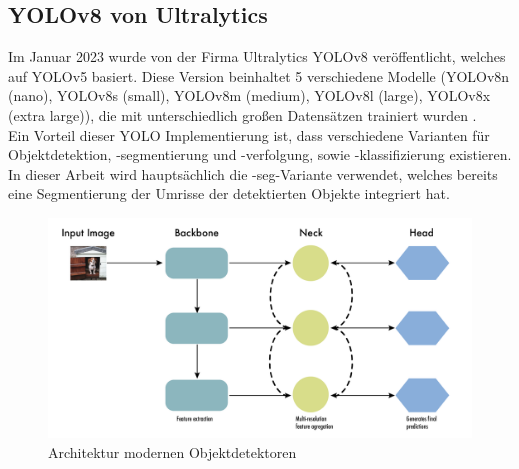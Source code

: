 	\subsection{YOLOv8 von Ultralytics}{ \label{subsec:YOLOv8_theoretic}
	
	Im Januar 2023 wurde von der Firma Ultralytics YOLOv8 veröffentlicht, welches auf YOLOv5 basiert. Diese Version beinhaltet 5 verschiedene Modelle (YOLOv8n (nano), YOLOv8s (small), YOLOv8m (medium), YOLOv8l (large), YOLOv8x (extra large)), die mit unterschiedlich großen Datensätzen trainiert wurden  \citep{Terven2023}. \\	
	Ein Vorteil dieser YOLO Implementierung ist, dass verschiedene Varianten für Ob\-jekt\-det\-ekt\-ion, -seg\-men\-tier\-ung und -ver\-fol\-gung, sowie -klas\-si\-fi\-zier\-ung existieren. In dieser Arbeit wird hauptsächlich die \glqq -seg\grqq{}-Variante verwendet, welches bereits eine Segmentierung der Umrisse der detektierten Objekte integriert hat.

	\begin{figure}[h]
		\centering
		\includegraphics*[scale = 0.20, keepaspectratio]{images/YOLO/YOLOv8_object_detector_general.png}
		\caption[Architektur modernen Objektdetektoren]{Architektur modernen Objektdetektoren \citep{Terven2023}}
		\label{YOLO_obj_det_gen}
	\end{figure}

}
